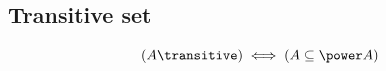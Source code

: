 \def\topic{}


\subsection{Transitive set}
\begin{definition}
\label{def:transitive through power}
\[
(A \transitive)\iff (A\subseteq \power A)
\]
\end{definition}


